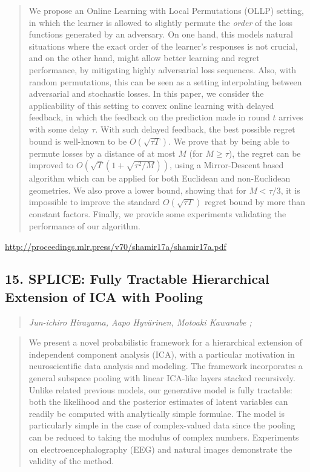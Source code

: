 \documentclass{article}
\begin{document}
\begin{quote}
    We propose an Online Learning with Local Permutations (OLLP) setting, in which the learner is allowed to slightly permute the \textit{order} of the loss functions generated by an adversary. On one hand, this models natural situations where the exact order of the learner’s responses is not crucial, and on the other hand, might allow better learning and regret performance, by mitigating highly adversarial loss sequences. Also, with random permutations, this can be seen as a setting interpolating between adversarial and stochastic losses. In this paper, we consider the applicability of this setting to convex online learning with delayed feedback, in which the feedback on the prediction made in round $t$ arrives with some delay $\tau$. With such delayed feedback, the best possible regret bound is well-known to be $O(\sqrt{\tau T})$. We prove that by being able to permute losses by a distance of at most $M$ (for $M\geq \tau$), the regret can be improved to $O(\sqrt{T}(1+\sqrt{\tau^2/M}))$, using a Mirror-Descent based algorithm which can be applied for both Euclidean and non-Euclidean geometries. We also prove a lower bound, showing that for $M<\tau/3$, it is impossible to improve the standard $O(\sqrt{\tau T})$ regret bound by more than constant factors. Finally, we provide some experiments validating the performance of our algorithm.  \end{quote}

\href{http://proceedings.mlr.press/v70/shamir17a/shamir17a.pdf}{http://proceedings.mlr.press/v70/shamir17a/shamir17a.pdf}

\subsection{15. SPLICE: Fully Tractable Hierarchical Extension of ICA with Pooling}

\begin{quote}
\footnotesize{\textit{Jun-ichiro Hirayama, Aapo Hyvärinen, Motoaki Kawanabe ;}}
\end{quote}

\begin{quote}
    We present a novel probabilistic framework for a hierarchical extension of independent component analysis (ICA), with a particular motivation in neuroscientific data analysis and modeling. The framework incorporates a general subspace pooling with linear ICA-like layers stacked recursively. Unlike related previous models, our generative model is fully tractable: both the likelihood and the posterior estimates of latent variables can readily be computed with analytically simple formulae. The model is particularly simple in the case of complex-valued data since the pooling can be reduced to taking the modulus of complex numbers. Experiments on electroencephalography (EEG) and natural images demonstrate the validity of the method.  \end{quote}
\end{document}
